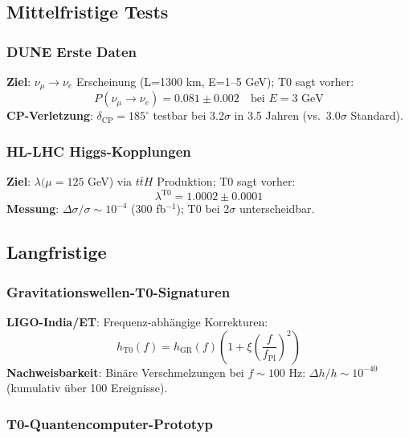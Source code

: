 	\subsection{Mittelfristige Tests}
	
	\subsubsection{DUNE Erste Daten}
	
	\textbf{Ziel}: $\nu_\mu \to \nu_e$ Erscheinung (L=1300 km, E=1--5 GeV); T0 sagt vorher:
	\begin{equation}
		P(\nu_\mu \to \nu_e) = 0.081 \pm 0.002 \quad \text{bei } E=3 \text{ GeV} \tag{ML-Gl.~6.2}
	\end{equation}
	\textbf{CP-Verletzung}: $\delta_{\text{CP}} = 185^\circ$ testbar bei 3.2$\sigma$ in 3.5 Jahren (vs.~3.0$\sigma$ Standard).
	
	\subsubsection{HL-LHC Higgs-Kopplungen}
	
	\textbf{Ziel}: $\lambda(\mu=125$ GeV) via $t\bar{t}H$ Produktion; T0 sagt vorher:
	\begin{equation}
		\lambda^{\text{T0}} = 1.0002 \pm 0.0001 \tag{ML-Gl.~6.3}
	\end{equation}
	\textbf{Messung}: $\Delta\sigma/\sigma \sim 10^{-4}$ (300 fb$^{-1}$); T0 bei 2$\sigma$ unterscheidbar.
	
	\subsection{Langfristige}
	
	\subsubsection{Gravitationswellen-T0-Signaturen}
	
	\textbf{LIGO-India/ET}: Frequenz-abhängige Korrekturen:
	\begin{equation}
		h_{\text{T0}}(f) = h_{\text{GR}}(f) \left(1 + \xi \left(\frac{f}{f_{\text{Pl}}}\right)^2\right) \tag{T0-Orig Gl.~8.1.2}
	\end{equation}
	\textbf{Nachweisbarkeit}: Binäre Verschmelzungen bei $f\sim100$ Hz: $\Delta h/h \sim 10^{-40}$ (kumulativ über 100 Ereignisse).
	
	\subsubsection{T0-Quantencomputer-Prototyp}
	
